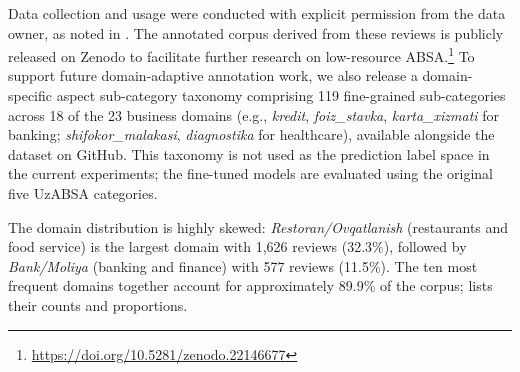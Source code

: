 \documentclass[bdcc,article,submit,moreauthors]{Definitions/mdpi}
\begin{document}
Data collection and usage were conducted with explicit permission from the data owner, as noted in . The annotated corpus derived from these reviews is publicly released on Zenodo to facilitate further research on low-resource ABSA.\footnote{\url{https://doi.org/10.5281/zenodo.22146677}} To support future domain-adaptive annotation work, we also release a domain-specific aspect sub-category taxonomy comprising 119 fine-grained sub-categories across 18 of the 23 business domains (e.g., \textit{kredit}, \textit{foiz\_stavka}, \textit{karta\_xizmati} for banking; \textit{shifokor\_malakasi}, \textit{diagnostika} for healthcare), available alongside the dataset on GitHub. This taxonomy is not used as the prediction label space in the current experiments; the fine-tuned models are evaluated using the original five UzABSA categories.

The domain distribution is highly skewed: \textit{Restoran/Ovqatlanish} (restaurants and food service) is the largest domain with 1{,}626 reviews (32.3\%), followed by \textit{Bank/Moliya} (banking and finance) with 577 reviews (11.5\%). The ten most frequent domains together account for approximately 89.9\% of the corpus;  lists their counts and proportions.
\end{document}
